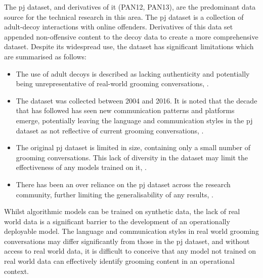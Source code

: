 \documentclass[12pt,a4paper,oneside]{report}
\begin{document}
The \gls{pj} dataset, and derivatives of it (PAN12, PAN13), are the predominant data source for the technical research in this area.  The \gls{pj} dataset is a collection of adult-decoy interactions with online offenders.  Derivatives of this data set appended non-offensive content to the decoy data to create a more comprehensive dataset.  Despite its widespread use, the dataset has significant limitations which are summarised as follows:

\begin{itemize}
    \item The use of adult decoys is described as lacking authenticity and potentially being unrepresentative of real-world grooming conversations, \citet{an2025revisiting,bihani2025evaluating,evans2025corpusassisted}.
    \item The dataset was collected between 2004 and 2016.  It is noted that the decade that has followed has seen new communication patterns and platforms emerge, potentially leaving the language and communication styles in the \gls{pj} dataset as not reflective of current grooming conversations, \citet{agarwal2022predatory,xiao2025adapting,lorenzo-dus2020communicative}.
    \item The original \gls{pj} dataset is limited in size, containing only a small number of grooming conversations.  This lack of diversity in the dataset may limit the effectiveness of any models trained on it, \citet{an2025revisiting,inches2012overview}.
    \item There has been an over reliance on the \gls{pj} dataset across the research community, further limiting the generalisability of any results, \citet{an2025revisiting,leiva-bianchi2025effectiveness}.
 \end{itemize}

 Whilst algorithmic models can be trained on synthetic data, the lack of real world data is a significant barrier to the development of an operationally deployable model.  The language and communication styles in real world grooming conversations may differ significantly from those in the \gls{pj} dataset, and without access to real world data, it is difficult to conceive that any model not trained on real world data can effectively identify grooming content in an operational context.
\end{document}
